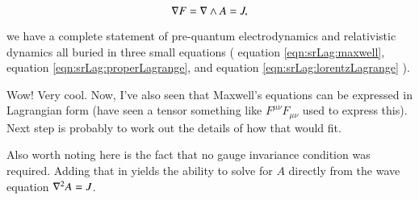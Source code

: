 \begin{equation}\label{eqn:srLag:maxwell}
\nabla F = \nabla \wedge A = J,
\end{equation}

we have a complete statement of pre-quantum electrodynamics and relativistic dynamics all buried in three small equations (
equation \ref{eqn:srLag:maxwell}, equation \ref{eqn:srLag:properLagrange}, and equation \ref{eqn:srLag:lorentzLagrange} ).

Wow!  Very cool.  Now, I've also seen that Maxwell's equations can be expressed in Lagrangian form (have seen a tensor something like $F^{\mu\nu} F_{\mu\nu}$ used to express this).  Next step is probably to work out the details of how that would fit.

Also worth noting here is the fact that no gauge invariance condition was required.  Adding that in yields the ability to solve for $A$ directly from the wave equation $\nabla^2 A = J$.
